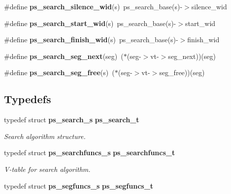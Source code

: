 \begin{DoxyCompactItemize}
\item 
\#define {\bfseries ps\-\_\-search\-\_\-silence\-\_\-wid}(s)~ps\-\_\-search\-\_\-base(s)-\/$>$silence\-\_\-wid\label{pocketsphinx__internal_8h_aab989bd93fe7abcc165bc92d6ccc1bac}

\item 
\#define {\bfseries ps\-\_\-search\-\_\-start\-\_\-wid}(s)~ps\-\_\-search\-\_\-base(s)-\/$>$start\-\_\-wid\label{pocketsphinx__internal_8h_a6dc7da2c1bc3bfb15d5fbe3618a4e3d4}

\item 
\#define {\bfseries ps\-\_\-search\-\_\-finish\-\_\-wid}(s)~ps\-\_\-search\-\_\-base(s)-\/$>$finish\-\_\-wid\label{pocketsphinx__internal_8h_aaeee657147579bc652c494989622f6b4}

\item 
\#define {\bfseries ps\-\_\-search\-\_\-seg\-\_\-next}(seg)~($\ast$(seg-\/$>$vt-\/$>$seg\-\_\-next))(seg)\label{pocketsphinx__internal_8h_ae7c150fad9fc9e8a13e632a1386b8f56}

\item 
\#define {\bfseries ps\-\_\-search\-\_\-seg\-\_\-free}(s)~($\ast$(seg-\/$>$vt-\/$>$seg\-\_\-free))(seg)\label{pocketsphinx__internal_8h_a38f6b225e3eace3793cdae8135b0aaab}

\end{DoxyCompactItemize}
\subsection*{Typedefs}
\begin{DoxyCompactItemize}
\item 
typedef struct {\bf ps\-\_\-search\-\_\-s} {\bf ps\-\_\-search\-\_\-t}\label{pocketsphinx__internal_8h_adc3de4d62e46c5e6cb93d09fb61be8ee}

\begin{DoxyCompactList}\small\item\em Search algorithm structure. \end{DoxyCompactList}\item 
typedef struct {\bf ps\-\_\-searchfuncs\-\_\-s} {\bf ps\-\_\-searchfuncs\-\_\-t}\label{pocketsphinx__internal_8h_a0eae078e32bd5f339792884c68aad8b3}

\begin{DoxyCompactList}\small\item\em V-\/table for search algorithm. \end{DoxyCompactList}\item 
typedef struct {\bf ps\-\_\-segfuncs\-\_\-s} {\bfseries ps\-\_\-segfuncs\-\_\-t}\label{pocketsphinx__internal_8h_a08187b85c6bc5b4991632dc78e237977}

\end{DoxyCompactItemize}
